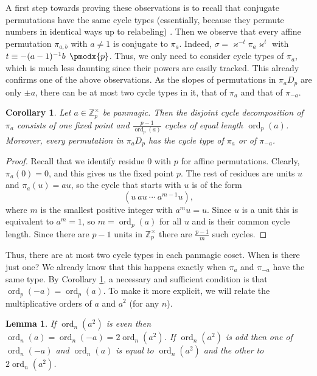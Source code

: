 \documentclass[11pt]{article}
\makeatletter
\renewcommand{\pmod}{%
  \allowbreak
  \if@display\mkern18mu\else\mkern8mu\fi
  \pmodx
}
\theoremstyle{plain}
\newtheorem{lemma}{Lemma}
\newtheorem{corollary}{Corollary}
\theoremstyle{definition}
\newcommand{\+}[1]{{#1}^\times}
\DeclareMathOperator{\ord}{ord}
\def\Z{{\mathbb Z}}
\def\s{{\sigma}}
\def\k{{\varkappa}}
\makeatother
\begin{document}
A first step towards proving these observations is to recall that conjugate permutations have the same cycle types (essentially, because they permute numbers in identical ways up to relabeling) \cite{Gallian}. Then we observe that every affine permutation $\pi_{a,b}$ with $a\neq1$ is conjugate to $\pi_a$. Indeed, $\s=\k^{-t}\pi_a\k^t$ with $t\equiv-(a-1)^{-1}b\pmod{p}$. Thus, we only need to consider cycle types of $\pi_a$, which is much less daunting since their powers are easily tracked. This already confirms one of the above observations. As the  slopes of permutations in $\pi_aD_p$ are only $\pm a$, there can be at most two cycle types in it, that of $\pi_a$ and that of $\pi_{-a}$. 
\begin{corollary}\label{primecycletypes}
Let $a\in\Z_p^{\times}$ be panmagic. Then the disjoint cycle decomposition of $\pi_a$ consists of one fixed point and $\frac{p-1}{\ord_p(a)}$ cycles of equal length $\ord_p(a)$. Moreover, every permutation in $\pi_aD_p$ has the cycle type of $\pi_a$ or of $\pi_{-a}$.
\end{corollary}
\begin{proof} 
Recall that we identify residue $0$ with $p$ for affine permutations. Clearly, $\pi_a(0)=0$, and this gives us the fixed point $p$. The rest of residues are units $u$ and $\pi_a(u)=au$, so the cycle that starts with $u$ is of the form 
$$
(u\ au\ \cdots\ a^{m-1}u),
$$
where $m$ is the smallest positive integer with $a^mu=u$. Since $u$ is a unit this is equivalent to $a^m=1$, so $m=\ord_p(a)$ for all $u$ and is their common cycle length. Since there are $p-1$ units in $\Z_p^{\times}$ there are $\frac{p-1}{m}$ such cycles.
\end{proof}
Thus, there are at most two cycle types in each panmagic coset. When is there just one? We already know that this happens exactly when $\pi_a$ and $\pi_{-a}$ have the same type. By Corollary \ref{primecycletypes}, a necessary and sufficient condition is that $\ord_p(-a)=\ord_p(a)$. To make it more explicit, we will relate the  multiplicative orders of $a$ and $a^2$ (for any $n$).
\begin{lemma}\label{ord+-a}
If $\ord_n(a^2)$ is even then $\ord_n(a)=\ord_n(-a)=2\ord_n(a^2)$. If $\ord_n(a^2)$ is odd then one of $\ord_n(-a)$ and $\ord_n(a)$ is equal to $\ord_n(a^2)$ and the other to $2\ord_n(a^2)$. 
\end{lemma}
\end{document}
